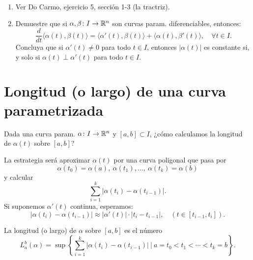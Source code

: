 \begin{ex}
	\begin{enumerate}
		\item Ver Do Carmo, ejercicio 5, sección 1-3 (la tractriz).

		\item Demuestre que si $\alpha, \beta \colon I \to \mathbb{R}^{n}$ son curvas param. diferenciables, entonces:
		\[ \frac{d}{dt} \langle \alpha(t), \beta(t) \rangle = \langle \alpha'(t), \beta(t) \rangle + \langle \alpha(t), \beta'(t) \rangle, \quad \forall t \in I. \]
		Concluya que si $\alpha'(t) \neq 0$ para todo $t \in I$, entonces $| \alpha(t) |$ es constante si, y solo si $\alpha(t) \perp \alpha'(t)$ para todo $t \in I$.
	\end{enumerate}
\end{ex}

\section{Longitud (o largo) de una curva parametrizada}

\begin{problem}
	Dada una curva param. $\alpha \colon I \to \mathbb{R}^{n}$ y $[a,b] \subset I$, ¿cómo calculamos la longitud de $\alpha(t)$ sobre $[a,b]$?
\end{problem}

La estrategia será aproximar $\alpha(t)$ por una curva poligonal que pasa por 
\[ \alpha(t_{0}) = \alpha(a),\ \alpha(t_{1}), \dots,\ \alpha(t_{k}) = \alpha(b) \]
y calcular
\[ \sum_{i=1}^{k} | \alpha(t_{i}) - \alpha(t_{i-1}) |. \]
Si suponemos $\alpha'(t)$ continua, esperamos:
\[ |\alpha(t_{i}) - \alpha(t_{i-1})| \approx |\alpha'(t)| \cdot |t_{i} - t_{i-1}|, \quad (t \in [t_{i-1}, t_{i}]). \]

\begin{definition}[longitud]
	La longitud (o largo) de $\alpha$ sobre $[a,b]$ es el número
	\[ L_{a}^{b}(\alpha) = \sup \left\{ \sum_{i=1}^{k} |\alpha(t_{i}) - \alpha(t_{i-1})| \ \Big| \ a = t_{0} < t_{1} < \cdots < t_{k} = b \right\}. \]
\end{definition}
